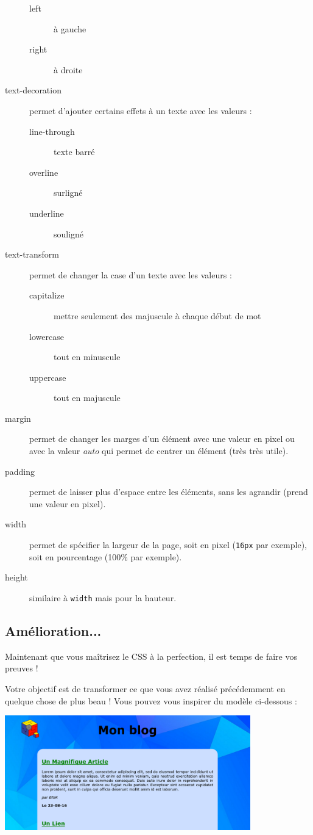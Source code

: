 \begin{description}
\begin{description}
  \item[left] à gauche
  \item[right] à droite
  \end{description}
\item [text-decoration] permet d'ajouter certains effets à un
  texte avec les valeurs :
  \begin{description}
  \item[line-through] texte barré
  \item[overline] surligné
  \item[underline] souligné
  \end{description}
\item [text-transform] permet de changer la case d’un texte
  avec les valeurs :
  \begin{description}
  \item[capitalize] mettre seulement des  majuscule à chaque début de mot
  \item[lowercase] tout en minuscule
  \item[uppercase] tout en majuscule
  \end{description}
\item [margin] permet de changer les marges d’un élément avec
  une valeur en pixel ou avec la valeur \textit{auto} qui permet de centrer un
  élément (très très utile).
\item [padding] permet de laisser plus d’espace entre les
  éléments, sans les agrandir (prend une valeur en pixel).
\item [width] permet de spécifier la largeur de la page, soit
  en pixel (\texttt{16px} par exemple), soit en pourcentage (100\%
  par exemple).
\item [height] similaire à \texttt{width} mais pour la hauteur.
\end{description}

\subsection{Amélioration...}

Maintenant que vous maîtrisez le CSS à la perfection, il est temps de faire
vos preuves !

Votre objectif est de transformer ce que vous avez réalisé précédemment en
quelque chose de plus beau ! Vous pouvez vous inspirer du modèle ci-dessous :
\begin{center}
  \includegraphics[width=0.8\textwidth]{img/image1.png}
\end{center}
